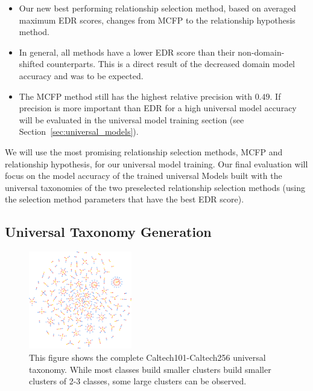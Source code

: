 \begin{itemize}
      \item Our new best performing relationship selection method,
            based on averaged maximum EDR scores, changes from MCFP to the relationship hypothesis method.
      \item In general, all methods have a lower EDR score than their non-domain-shifted counterparts.
            This is a direct result of the decreased domain model accuracy and was to be expected.
      \item The MCFP method still has the highest relative precision with $0.49$.
            If precision is more important than EDR for a high universal model accuracy
            will be evaluated in the universal model training section (see Section~\ref{sec:universal_models}).
\end{itemize}

We will use the most promising relationship selection methods,
MCFP and relationship hypothesis, for our universal model training.
Our final evaluation will focus on the model accuracy of the trained universal Models
built with the universal taxonomies of the two preselected relationship selection methods
(using the selection method parameters that have the best EDR score).

\subsection{Universal Taxonomy Generation}

\begin{figure}[H]
      \centering
      \includegraphics[width=0.4\textwidth]{figures/taxonomy.png}

      \caption{This figure shows the complete Caltech101-Caltech256 universal taxonomy.
            While most classes build smaller clusters build smaller clusters of 2-3 classes,
            some large clusters can be observed.}
      \label{fig:taxonomy}
\end{figure}

